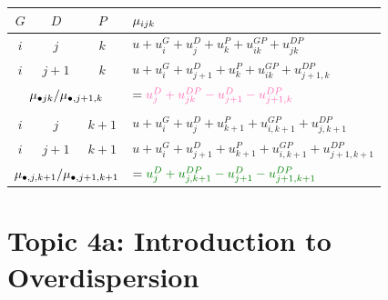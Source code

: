 \documentclass[oneside]{book}\usepackage[]{graphicx}\usepackage[svgnames]{xcolor}
\let\log\relax%
\begin{document}
\begin{table}[H]
    \centering
    \begin{tabular}{cccl}
        $ G $                                                                   & $ D $                                                                     & $ P $   & $ \log{\mu_{ijk}} $                                             \\
        \midrule
        $ i $                                                                   & $ j $                                                                     & $ k $   & $ u+u_i^G+u_j^D+u_k^P+u_{ik}^{GP}+u_{jk}^{DP} $                 \\
        $ i $                                                                   & $ j+1 $                                                                   & $ k $   & $ u+u_i^G+u_{j+1}^D+u_k^P+u_{ik}^{GP}+u_{j+1,k}^{DP} $          \\
        \midrule
        \multicolumn{3}{c}{$ \log{\mu_{\bullet jk}/\mu_{\bullet,j+1,k}} $}      & $ =\textcolor{HotPink}{u_j^D+u_{jk}^{DP}-u_{j+1}^{D}-u_{j+1,k}^{DP}} $                                                                                \\\\
        \midrule
        $ i $                                                                   & $ j $                                                                     & $ k+1 $ & $ u+u_i^G+u_{j}^D+u_{k+1}^P+u_{i,k+1}^{GP}+u_{j,k+1}^{DP} $     \\
        $ i $                                                                   & $ j+1 $                                                                   & $ k+1 $ & $ u+u_i^G+u_{j+1}^D+u_{k+1}^P+u_{i,k+1}^{GP}+u_{j+1,k+1}^{DP} $ \\
        \midrule
        \multicolumn{3}{c}{$ \log{\mu_{\bullet,j,k+1}/\mu_{\bullet,j+1,k+1}} $} & $ =\textcolor{Green}{u_j^D+u_{j,k+1}^{DP}-u_{j+1}^{D}-u_{j+1,k+1}^{DP}} $
    \end{tabular}
\end{table}

\section*{Topic 4a: Introduction to Overdispersion}
\end{document}
